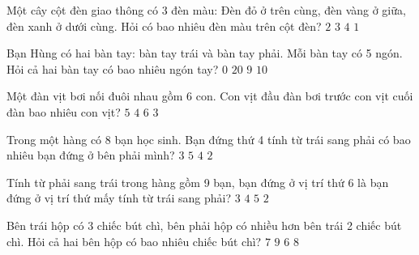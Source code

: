 \begin{ex} %
Một cây cột đèn giao thông có 3 đèn màu: Đèn đỏ ở trên cùng, đèn vàng ở giữa, đèn xanh ở dưới cùng. Hỏi có bao nhiêu đèn màu trên cột đèn?
\choice
{$2$}
{\True $3$}
{$4$}
{$1$}
\end{ex}

\begin{ex} %
Bạn Hùng có hai bàn tay: bàn tay trái và bàn tay phải. Mỗi bàn tay có 5 ngón. Hỏi cả hai bàn tay có bao nhiêu ngón tay?
\choice
{$0$}
{$20$}
{$9$}
{\True $10$}
\end{ex}

\begin{ex} %
Một đàn vịt bơi nối đuôi nhau gồm 6 con. Con vịt đầu đàn bơi trước con vịt cuối đàn bao nhiêu con vịt?
\choice
{\True $5$}
{$4$}
{$6$}
{$3$}
\end{ex}

\begin{ex} %
Trong một hàng có 8 bạn học sinh. Bạn đứng thứ 4 tính từ trái sang phải có bao nhiêu bạn đứng ở bên phải mình?
\choice
{$3$}
{$5$}
{\True $4$}
{$2$}
\end{ex}

\begin{ex} %
Tính từ phải sang trái trong hàng gồm 9 bạn, bạn đứng ở vị trí thứ 6 là bạn đứng ở vị trí thứ mấy tính từ trái sang phải?
\choice
{$3$}
{\True $4$}
{$5$}
{$2$}
\end{ex}

\begin{ex} %
Bên trái hộp có 3 chiếc bút chì, bên phải hộp có nhiều hơn bên trái 2 chiếc bút chì. Hỏi cả hai bên hộp có bao nhiêu chiếc bút chì?
\choice
{$7$}
{$9$}
{$6$}
{\True $8$}
\end{ex}

